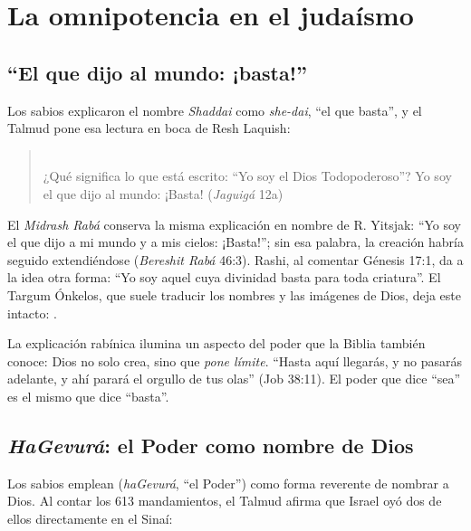 \section{La omnipotencia en el judaísmo}\label{sec:judaismo-omni}

\subsection{“El que dijo al mundo: ¡basta!”}

Los sabios explicaron el nombre \emph{Shaddai} como \emph{she-dai}, ``el que basta'', y el Talmud pone esa lectura en boca de Resh Laquish:

\begin{quote}\small
{}\\
¿Qué significa lo que está escrito: ``Yo soy el Dios Todopoderoso''? Yo soy el que dijo al mundo: ¡Basta! (\emph{Jaguigá} 12a)
\end{quote}

El \emph{Midrash Rabá} conserva la misma explicación en nombre de R. Yitsjak: ``Yo soy el que dijo a mi mundo y a mis cielos: ¡Basta!''; sin esa palabra, la creación habría seguido extendiéndose (\emph{Bereshit Rabá} 46:3). Rashi, al comentar Génesis 17:1, da a la idea otra forma: ``Yo soy aquel cuya divinidad basta para toda criatura''. El Targum Ónkelos, que suele traducir los nombres y las imágenes de Dios, deja este intacto: .

La explicación rabínica ilumina un aspecto del poder que la Biblia también conoce: Dios no solo crea, sino que \emph{pone límite}. ``Hasta aquí llegarás, y no pasarás adelante, y ahí parará el orgullo de tus olas'' (Job 38:11). El poder que dice ``sea'' es el mismo que dice ``basta''.


\subsection{\emph{HaGevurá}: el Poder como nombre de Dios}

Los sabios emplean  (\emph{haGevurá}, ``el Poder'') como forma reverente de nombrar a Dios. Al contar los 613 mandamientos, el Talmud afirma que Israel oyó dos de ellos directamente en el Sinaí:

